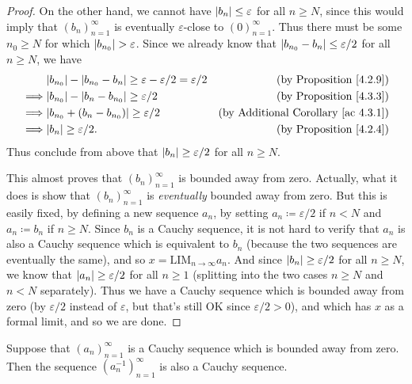\begin{proof}
    On the other hand, we cannot have \(\abs*{b_n} \leq \varepsilon\) for all \(n \geq N\), since this would imply that \((b_n)_{n = 1}^{\infty}\) is eventually \(\varepsilon\)-close to \((0)_{n = 1}^{\infty}\).
    Thus there must be some \(n_0 \geq N\) for which \(\abs*{b_{n_0}} > \varepsilon\).
    Since we already know that \(\abs*{b_{n_0} - b_n} \leq \varepsilon / 2\) for all \(n \geq N\), we have
    \begin{align*}
                 & \abs*{b_{n_0}} - \abs*{b_{n_0} - b_n} \geq \varepsilon - \varepsilon / 2 = \varepsilon / 2 & \text{(by Proposition \ref{4.2.9})}             \\
        \implies & \abs*{b_{n_0}} - \abs*{b_n - b_{n_0}} \geq \varepsilon / 2                                 & \text{(by Proposition \ref{4.3.3})}             \\
        \implies & \abs*{b_{n_0} + (b_n - b_{n_0})} \geq \varepsilon / 2                                      & \text{(by Additional Corollary \ref{ac 4.3.1})} \\
        \implies & \abs*{b_n} \geq \varepsilon / 2.                                                           & \text{(by Proposition \ref{4.2.4})}             \\
    \end{align*}
    Thus conclude from above that \(\abs*{b_n} \geq \varepsilon / 2\) for all \(n \geq N\).

    This almost proves that \((b_n)_{n = 1}^{\infty}\) is bounded away from zero.
    Actually, what it does is show that \((b_n)_{n = 1}^{\infty}\) is \emph{eventually} bounded away from zero.
    But this is easily fixed, by defining a new sequence \(a_n\), by setting \(a_n \coloneqq \varepsilon / 2\) if \(n < N\) and \(a_n \coloneqq b_n\) if \(n \geq N\).
    Since \(b_n\) is a Cauchy sequence, it is not hard to verify that \(a_n\) is also a Cauchy sequence which is equivalent to \(b_n\) (because the two sequences are eventually the same), and so \(x = \text{LIM}_{n \to \infty} a_n\).
    And since \(\abs*{b_n} \geq \varepsilon / 2\) for all \(n \geq N\), we know that \(\abs*{a_n} \geq \varepsilon / 2\) for all \(n \geq 1\) (splitting into the two cases \(n \geq N\) and \(n < N\) separately).
    Thus we have a Cauchy sequence which is bounded away from zero (by \(\varepsilon / 2\) instead of \(\varepsilon\), but that's still OK since \(\varepsilon / 2 > 0\)), and which has \(x\) as a formal limit, and so we are done.
\end{proof}

\begin{lemma}\label{5.3.15}
    Suppose that \((a_n)_{n = 1}^{\infty}\) is a Cauchy sequence which is bounded away from zero.
    Then the sequence \((a_n^{-1})_{n = 1}^{\infty}\) is also a Cauchy sequence.
\end{lemma}


